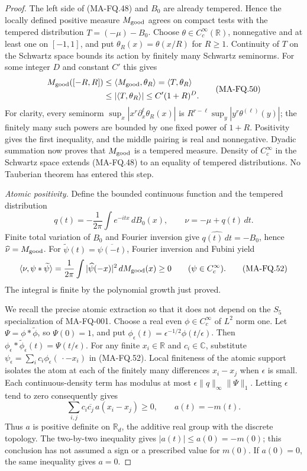 \begin{proof}
The left side of (MA-FQ.48) and $B_0$ are already
tempered. Hence the locally defined positive measure
$M_{\rm good}$ agrees on compact tests with the tempered
distribution $T=\widehat{(-\mu)}-B_0$.
Choose $\theta\in C_c^\infty(\mathbb R)$, nonnegative
and at least one on $[-1,1]$, and put
$\theta_R(x)=\theta(x/R)$ for $R\ge1$.
Continuity of $T$ on the Schwartz space bounds its
action by finitely many Schwartz seminorms. For some
integer $D$ and constant $C'$ this gives
\[
 \begin{aligned}
 M_{\rm good}([-R,R])
   &\le\langle M_{\rm good},\theta_R\rangle
      =\langle T,\theta_R\rangle\\
   &\le |\langle T,\theta_R\rangle|
      \le C'(1+R)^D.
 \end{aligned}
 \tag{MA-FQ.50}
\]
For clarity, every seminorm
$\sup_x|x^r\partial_x^\ell\theta_R(x)|$ is
$R^{r-\ell}\sup_y|y^r\theta^{(\ell)}(y)|$;
the finitely many such powers are bounded by one
fixed power of $1+R$. Positivity gives the first
inequality, and the middle pairing is real and
nonnegative. Dyadic summation now proves that
$M_{\rm good}$ is a tempered measure. Density of
$C_c^\infty$ in the Schwartz space extends
(MA-FQ.48) to an equality of tempered distributions.
No Tauberian theorem has entered this step.

\emph{Atomic positivity.}
Define the bounded continuous function and the tempered
distribution
\[
 q(t)=-\frac1{2\pi}\int e^{-itx}\,dB_0(x),
                 \qquad \nu=-\mu+q(t)\,dt.
 \tag{MA-FQ.51}
\]
Finite total variation of $B_0$ and Fourier inversion
give $\widehat{q(t)\,dt}=-B_0$, hence
$\widehat\nu=M_{\rm good}$.
For $\widetilde\psi(t)=\overline{\psi(-t)}$,
Fourier inversion and Fubini yield
\[
 \langle\nu,\psi*\widetilde\psi\rangle
      =\frac1{2\pi}\int
                    |\widehat\psi(-x)|^2\,dM_{\rm good}(x)
      \ge0\qquad(\psi\in C_c^\infty).
 \tag{MA-FQ.52}
\]
The integral is finite by the polynomial growth just proved.

We recall the precise atomic extraction so that it does not
depend on the $S_5$ specialization of MA-FQ-001.
Choose a real even $\phi\in C_c^\infty$ of $L^2$ norm one.
Let $\Psi=\phi*\widetilde\phi$, so $\Psi(0)=1$, and put
$\phi_\epsilon(t)=\epsilon^{-1/2}\phi(t/\epsilon)$.
Then $\phi_\epsilon*\widetilde\phi_\epsilon(t)
=\Psi(t/\epsilon)$.
For any finite $x_i\in\mathbb R$ and $c_i\in\mathbb C$,
substitute
$\psi_\epsilon=\sum_i c_i\phi_\epsilon(\,\cdot-x_i)$
in (MA-FQ.52).
Local finiteness of the atomic support isolates the atom
at each of the finitely many differences $x_i-x_j$
when $\epsilon$ is small. Each continuous-density term
has modulus at most
$\epsilon\|q\|_\infty\|\Psi\|_1$.
Letting $\epsilon$ tend to zero consequently gives
\[
 \sum_{i,j}c_i\overline{c_j}\,a(x_i-x_j)\ge0,
                     \qquad a(t)=-m(t).
 \tag{MA-FQ.53}
\]
Thus $a$ is positive definite on $\mathbb R_d$,
the additive real group with the discrete topology.
The two-by-two inequality gives
$|a(t)|\le a(0)=-m(0)$; this conclusion has not
assumed a sign or a prescribed value for $m(0)$.
If $a(0)=0$, the same inequality gives $a=0$.


\end{proof}
